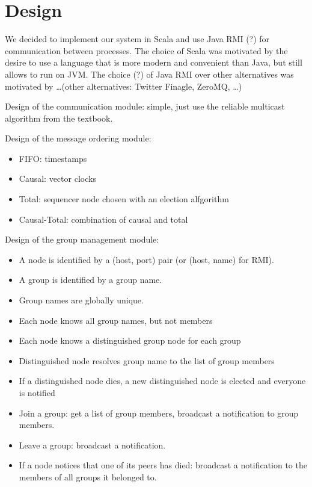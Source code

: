 \documentclass[10pt, oneside]{article}
\begin{document}
\section{Design}

We decided to implement our system in Scala and use Java RMI (?) for
communication between processes. The choice of Scala was motivated by the desire
to use a language that is more modern and convenient than Java, but still allows
to run on JVM. The choice (?) of Java RMI over other alternatives was motivated
by \ldots (other alternatives: Twitter Finagle, ZeroMQ, \ldots)

Design of the communication module: simple, just use the reliable multicast
algorithm from the textbook.

Design of the message ordering module:
\begin{itemize}
\item FIFO: timestamps
\item Causal: vector clocks
\item Total: sequencer node chosen with an election alfgorithm
\item Causal-Total: combination of causal and total
\end{itemize}

Design of the group management module:
\begin{itemize}
\item A node is identified by a (host, port) pair (or (host, name) for RMI).
\item A group is identified by a group name.
\item Group names are globally unique.
\item Each node knows all group names, but not members
\item Each node knows a distinguished group node for each group
\item Distinguished node resolves group name to the list of group members
\item If a distinguished node dies, a new distinguished node is elected and
  everyone is notified
\item Join a group: get a list of group members, broadcast a notification to
  group members.
\item Leave a group: broadcast a notification.
\item If a node notices that one of its peers has died: broadcast a notification
  to the members of all groups it belonged to.
\end{itemize}
\end{document}
